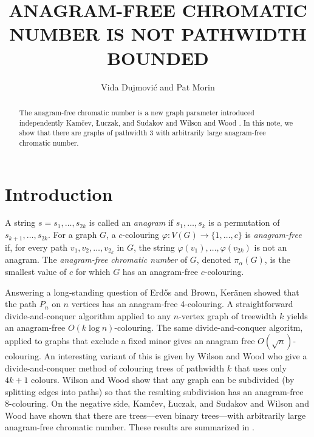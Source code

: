 \documentclass{patmorin}
\title{\MakeUppercase{Anagram-Free Chromatic Number is not Pathwidth Bounded}}
\author{Vida Dujmović and Pat Morin}%
\begin{document}
\maketitle
%
\begin{abstract}
  The anagram-free chromatic number is a new graph parameter introduced
  independently Kamčev, Łuczak, and Sudakov \cite{kamcev.luczak.ea:anagram-free}
  and Wilson and Wood \cite{wilson.wood:anagram-free}.  In this note, we show
  that there are graphs of pathwidth 3 with arbitrarily large anagram-free
  chromatic number.
\end{abstract}
%
%


\section{Introduction}

A string $s=s_1,\ldots,s_{2k}$ is called an \emph{anagram} if $s_1,\ldots,s_k$ is a permutation of $s_{k+1},\ldots,s_{2k}$.
For a graph $G$, a $c$-colouring $\varphi:V(G)\to\{1,\ldots,c\}$ is
\emph{anagram-free} if, for every path $v_1,v_2,\ldots,v_{2_k}$ in
$G$, the string $\varphi(v_1),\ldots,\varphi(v_{2k})$ is not an anagram.  The
\emph{anagram-free chromatic number} of $G$, denoted $\pi_\alpha(G)$, is
the smallest value of $c$ for which $G$ has an anagram-free $c$-colouring.

Answering a long-standing question of Erd\H{o}s and Brown, Ker\"anen
showed that the path $P_n$ on $n$ vertices has an anagram-free
4-colouring.  A straightforward divide-and-conquer algorithm applied
to any $n$-vertex graph of treewidth $k$ yields an anagram-free
$O(k\log n)$-colouring.  The same divide-and-conquer algoritm,
applied to graphs that exclude a fixed minor gives an anagram
free $O(\sqrt{n})$-colouring.  An interesting variant of this is
given by Wilson and Wood \cite{wilson.wood:anagram-free} who give a
divide-and-conquer method of colouring trees of pathwidth $k$ that uses
only $4k+1$ colours.  Wilson and Wood \cite{wilson.wood:anagram-free2}
show that any graph can be subdivided (by splitting edges into paths)
so that the resulting subdivision has an anagram-free 8-colouring.
On the negative side, Kamčev, Łuczak,
and Sudakov \cite{kamcev.luczak.ea:anagram-free} and Wilson and Wood
\cite{wilson.wood:anagram-free} have shown that there are trees---even binary trees---with arbitrarily large anagram-free chromatic number.
These results are summarized in .
\end{document}
